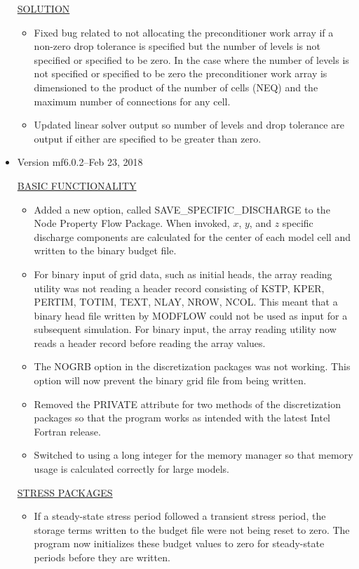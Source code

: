 \documentclass[11pt,twoside,twocolumn]{usgsreport}
\begin{document}
\begin{itemize}
\underline{SOLUTION}
\begin{itemize}
\item Fixed bug related to not allocating the preconditioner work array if a non-zero drop tolerance is specified but the number of levels is not specified or specified to be zero. In the case where the number of levels is not specified or specified to be zero the preconditioner work array is dimensioned to the product of the number of cells (NEQ) and the maximum number of connections for any cell.
\item Updated linear solver output so number of levels and drop tolerance are output if either are specified to be greater than zero. 
\end{itemize}

\item Version mf6.0.2--Feb 23, 2018

\underline{BASIC FUNCTIONALITY}
\begin{itemize}
\item Added a new option, called SAVE\_SPECIFIC\_DISCHARGE to the Node Property Flow Package.  When invoked, $x$, $y$, and $z$ specific discharge components are calculated for the center of each model cell and written to the binary budget file.
\item For binary input of grid data, such as initial heads, the array reading utility was not reading a header record consisting of KSTP, KPER, PERTIM, TOTIM, TEXT, NLAY, NROW, NCOL.  This meant that a binary head file written by MODFLOW could not be used as input for a subsequent simulation.  For binary input, the array reading utility now reads a header record before reading the array values.
\item The NOGRB option in the discretization packages was not working.  This option will now prevent the binary grid file from being written.
\item Removed the PRIVATE attribute for two methods of the discretization packages so that the program works as intended with the latest Intel Fortran release.
\item Switched to using a long integer for the memory manager so that memory usage is calculated correctly for large models.
\end{itemize}

\underline{STRESS PACKAGES}
\begin{itemize}
\item If a steady-state stress period followed a transient stress period, the storage terms written to the budget file were not being reset to zero.  The program now initializes these budget values to zero for steady-state periods before they are written.
\end{itemize}


\end{itemize}
\end{document}
